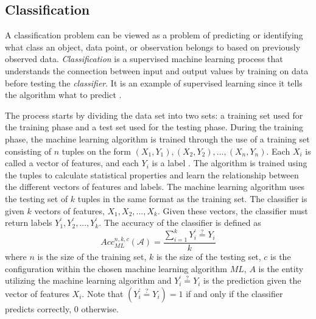 \subsection{Classification\label{subsec:classification-back}}

A classification problem can be viewed as a problem of predicting or identifying what class an object, data point, or observation belongs to based on previously observed data. \textit{Classification} is a supervised machine learning process that understands the connection between input and output values by training on data before testing the \textit{classifier}. It is an example of supervised learning since it tells the algorithm what to predict \cite{harrington2012machine}.

The process starts by dividing the data set into two sets: a training set used for the training phase and a test set used for the testing phase. During the training phase, the machine learning algorithm is trained through the use of a training set consisting of $n$ tuples on the form $(X_{1}, Y_{1}), (X_{2}, Y_{2}), ..., (X_{n}, Y_{n})$. Each $X_{i}$ is called a vector of features, and each $Y_{i}$ is a label \cite{DBLP:conf/sp/DyerCRS12}. The algorithm is trained using the tuples to calculate statistical properties and learn the relationship between the different vectors of features and labels. The machine learning algorithm uses the testing set of $k$ tuples in the same format as the training set. The classifier is given $k$ vectors of features, $X_{1}, X_{2}, ... , X_{k}$. Given these vectors, the classifier must return labels $Y^{'}_{1}, Y^{'}_{2}, ... , Y^{'}_{k}$. The accuracy of the classifier is defined as 
\begin{equation*}
Acc^{n,k,c}_{ML}(\mathcal{A})= \dfrac{\sum^{k}_{i=1} Y^{'}_{i} \stackrel{?}{=} Y_{i}}{k}
\end{equation*}
where $n$ is the size of the training set, $k$ is the size of the testing set, $c$ is the configuration within the chosen machine learning algorithm $ML$, $A$ is the entity utilizing the machine learning algorithm and $Y^{'}_{i} \stackrel{?}{=} Y_{i}$ is the prediction given the vector of features $X_{i}$. Note that $(Y^{'}_{i} \stackrel{?}{=} Y_{i}) = 1$ if and only if the classifier predicts correctly, $0$ otherwise.

